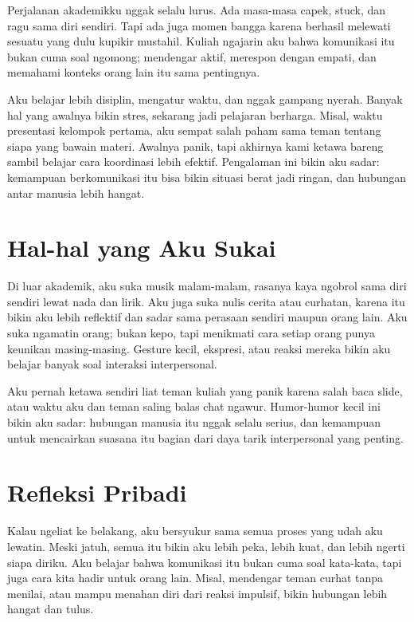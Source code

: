\documentclass[
  letterpaper,
  DIV=11,
  numbers=noendperiod]{scrreprt}
\begin{document}
Perjalanan akademikku nggak selalu lurus. Ada masa-masa capek, stuck,
dan ragu sama diri sendiri. Tapi ada juga momen bangga karena berhasil
melewati sesuatu yang dulu kupikir mustahil. Kuliah ngajarin aku bahwa
komunikasi itu bukan cuma soal ngomong; mendengar aktif, merespon dengan
empati, dan memahami konteks orang lain itu sama pentingnya.

Aku belajar lebih disiplin, mengatur waktu, dan nggak gampang nyerah.
Banyak hal yang awalnya bikin stres, sekarang jadi pelajaran berharga.
Misal, waktu presentasi kelompok pertama, aku sempat salah paham sama
teman tentang siapa yang bawain materi. Awalnya panik, tapi akhirnya
kami ketawa bareng sambil belajar cara koordinasi lebih efektif.
Pengalaman ini bikin aku sadar: kemampuan berkomunikasi itu bisa bikin
situasi berat jadi ringan, dan hubungan antar manusia lebih hangat.

\section{Hal-hal yang Aku Sukai}\label{hal-hal-yang-aku-sukai}

Di luar akademik, aku suka musik malam-malam, rasanya kaya ngobrol sama
diri sendiri lewat nada dan lirik. Aku juga suka nulis cerita atau
curhatan, karena itu bikin aku lebih reflektif dan sadar sama perasaan
sendiri maupun orang lain. Aku suka ngamatin orang; bukan kepo, tapi
menikmati cara setiap orang punya keunikan masing-masing. Gesture kecil,
ekspresi, atau reaksi mereka bikin aku belajar banyak soal interaksi
interpersonal.

Aku pernah ketawa sendiri liat teman kuliah yang panik karena salah baca
slide, atau waktu aku dan teman saling balas chat ngawur. Humor-humor
kecil ini bikin aku sadar: hubungan manusia itu nggak selalu serius, dan
kemampuan untuk mencairkan suasana itu bagian dari daya tarik
interpersonal yang penting.

\section{Refleksi Pribadi}\label{refleksi-pribadi}

Kalau ngeliat ke belakang, aku bersyukur sama semua proses yang udah aku
lewatin. Meski jatuh, semua itu bikin aku lebih peka, lebih kuat, dan
lebih ngerti siapa diriku. Aku belajar bahwa komunikasi itu bukan cuma
soal kata-kata, tapi juga cara kita hadir untuk orang lain. Misal,
mendengar teman curhat tanpa menilai, atau mampu menahan diri dari
reaksi impulsif, bikin hubungan lebih hangat dan tulus.
\end{document}

